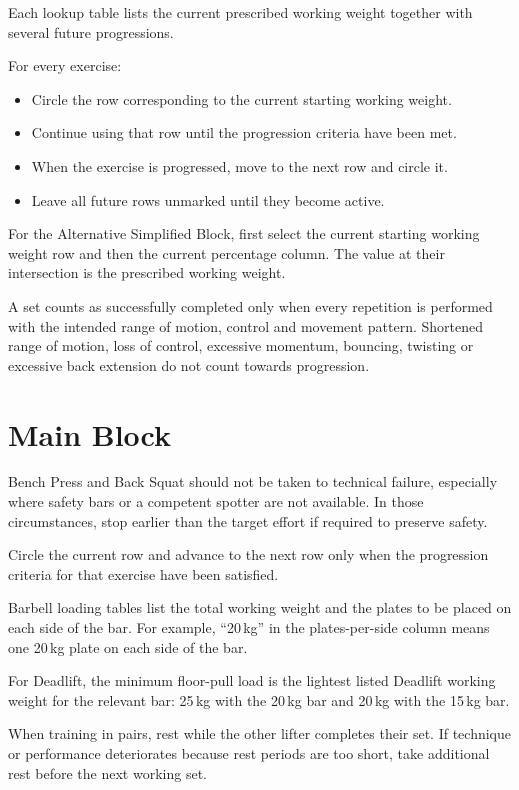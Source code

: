 \documentclass[11pt,a4paper]{article}
\begin{document}
Each lookup table lists the current prescribed working weight together with several future progressions.

For every exercise:

\begin{itemize}
\item Circle the row corresponding to the current starting working weight.
\item Continue using that row until the progression criteria have been met.
\item When the exercise is progressed, move to the next row and circle it.
\item Leave all future rows unmarked until they become active.
\end{itemize}

For the Alternative Simplified Block, first select the current starting working weight row and then the current percentage column. The value at their intersection is the prescribed working weight.

A set counts as successfully completed only when every repetition is performed with the intended range of motion, control and movement pattern. Shortened range of motion, loss of control, excessive momentum, bouncing, twisting or excessive back extension do not count towards progression.

\section{Main Block}

Bench Press and Back Squat should not be taken to technical failure, especially where safety bars or a competent spotter are not available. In those circumstances, stop earlier than the target effort if required to preserve safety.

Circle the current row and advance to the next row only when the progression criteria for that exercise have been satisfied.

Barbell loading tables list the total working weight and the plates to be placed on each side of the bar. For example, ``20\,kg'' in the plates-per-side column means one 20\,kg plate on each side of the bar.

For Deadlift, the minimum floor-pull load is the lightest listed Deadlift working weight for the relevant bar: 25\,kg with the 20\,kg bar and 20\,kg with the 15\,kg bar.

When training in pairs, rest while the other lifter completes their set. If technique or performance deteriorates because rest periods are too short, take additional rest before the next working set.
\end{document}
